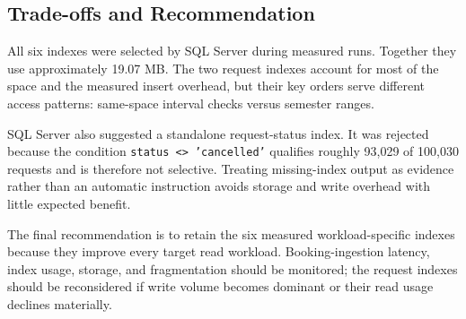 \subsection{Trade-offs and Recommendation}

All six indexes were selected by SQL Server during measured runs. Together they use approximately 19.07 MB. The two request indexes account for most of the space and the measured insert overhead, but their key orders serve different access patterns: same-space interval checks versus semester ranges.

SQL Server also suggested a standalone request-status index. It was rejected because the condition \texttt{status <> 'cancelled'} qualifies roughly 93,029 of 100,030 requests and is therefore not selective. Treating missing-index output as evidence rather than an automatic instruction avoids storage and write overhead with little expected benefit.

The final recommendation is to retain the six measured workload-specific indexes because they improve every target read workload. Booking-ingestion latency, index usage, storage, and fragmentation should be monitored; the request indexes should be reconsidered if write volume becomes dominant or their read usage declines materially.

